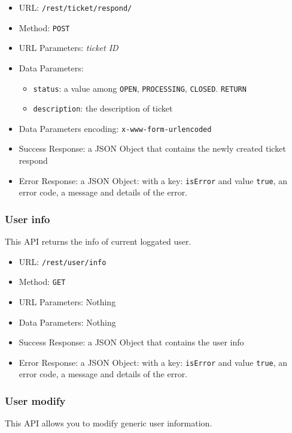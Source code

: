 \begin{itemize}
    \item URL: \texttt{/rest/ticket/respond/}
    \item Method: \texttt{POST}
    \item URL Parameters: \textit{ticket ID}
    \item Data Parameters:
    \begin{itemize}
        \item \texttt{status}: a value among \texttt{OPEN}, \texttt{PROCESSING}, \texttt{CLOSED}. \texttt{RETURN}
        \item \texttt{description}: the description of ticket
    \end{itemize}
    \item Data Parameters encoding: \texttt{x-www-form-urlencoded}
    \item Success Response: a JSON Object that contains the newly created ticket respond
    \item Error Response: a JSON Object: with a key: \texttt{isError}  and value \texttt{true}, an error code, a message and details of the error.
\end{itemize}

\subsubsection*{User info}

This API returns the info of current loggated user.

\begin{itemize}
    \item URL: \texttt{/rest/user/info}
    \item Method: \texttt{GET}
    \item URL Parameters: Nothing
    \item Data Parameters: Nothing
    \item Success Response: a JSON Object that contains the user info
    \item Error Response: a JSON Object: with a key: \texttt{isError}  and value \texttt{true}, an error code, a message and details of the error.
\end{itemize}


\subsubsection*{User modify}

This API allows you to modify generic user information.

